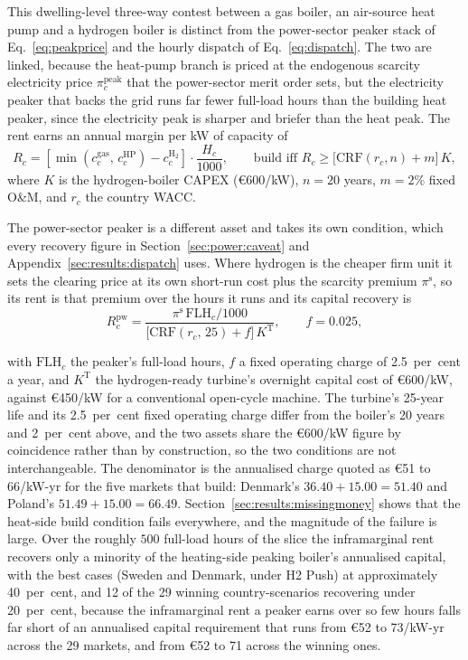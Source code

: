 This dwelling-level three-way contest between a gas boiler, an air-source heat pump and
a hydrogen boiler is distinct from the power-sector peaker stack of
Eq.~\eqref{eq:peakprice} and the hourly dispatch of Eq.~\eqref{eq:dispatch}. The two are
linked, because the heat-pump branch is priced at the endogenous scarcity electricity
price $\pi^{\mathrm{peak}}_{c}$ that the power-sector merit order sets, but the
electricity peaker that backs the grid runs far fewer full-load hours than the building
heat peaker, since the electricity peak is sharper and briefer than the heat peak. The
rent earns an annual margin per kW of capacity of
%
\begin{equation}
\label{eq:missingmoney}
    R_{c} = \left[\min\left(c^{\mathrm{gas}}_{c},\, c^{\mathrm{HP}}_{c}\right)
            - c^{\mathrm{H_2}}_{c}\right] \cdot \frac{H_{c}}{1000},
    \qquad
    \text{build iff } R_{c} \geq
        \bigl[\mathrm{CRF}(r_{c}, n) + m\bigr]\, K,
\end{equation}
%
where $K$ is the hydrogen-boiler CAPEX (\euro{}600/kW), $n{=}20$ years, $m{=}2\%$ fixed
O\&M, and $r_{c}$ the country WACC.

The power-sector peaker is a different asset and takes its own condition, which every
recovery figure in Section~\ref{sec:power:caveat} and Appendix~\ref{sec:results:dispatch}
uses. Where hydrogen is the cheaper firm unit it sets the clearing price at its own
short-run cost plus the scarcity premium $\pi^{\mathrm{s}}$, so its rent is that premium
over the hours it runs and its capital recovery is
%
\begin{equation}
\label{eq:powerrecovery}
    R^{\mathrm{pw}}_{c}
      = \frac{\pi^{\mathrm{s}}\,\mathrm{FLH}_{c}/1000}
             {\bigl[\mathrm{CRF}(r_{c},\,25) + f\bigr]\, K^{\mathrm{T}}},
    \qquad f = 0.025,
\end{equation}
%

with $\mathrm{FLH}_{c}$ the peaker's full-load hours, $f$ a fixed operating charge of
2.5~per~cent a year, and $K^{\mathrm{T}}$ the hydrogen-ready turbine's overnight capital
cost of \euro{}600/kW, against \euro{}450/kW for a conventional open-cycle machine. The
turbine's 25-year life and its 2.5~per~cent fixed operating charge differ from the
boiler's 20 years and 2~per~cent above, and the two assets share the \euro{}600/kW figure
by coincidence rather than by construction, so the two conditions are not interchangeable.
The denominator is the annualised charge quoted as \euro{}51 to 66/kW-yr for the five
markets that build: Denmark's $36.40+15.00=51.40$ and Poland's $51.49+15.00=66.49$.
Section~\ref{sec:results:missingmoney} shows that the heat-side build condition fails
everywhere, and the magnitude of the failure is large. Over the roughly $500$ full-load hours of the slice the inframarginal rent recovers only
a minority of the heating-side peaking boiler's annualised capital, with the best cases (Sweden and Denmark,
under H2 Push) at approximately 40~per~cent, and 12 of the 29 winning country-scenarios
recovering under 20~per~cent, because the inframarginal rent a peaker earns over so few
hours falls far short of an annualised capital requirement that runs from \euro{}52 to
73/kW-yr across the 29 markets, and from \euro{}52 to 71 across the winning ones.

